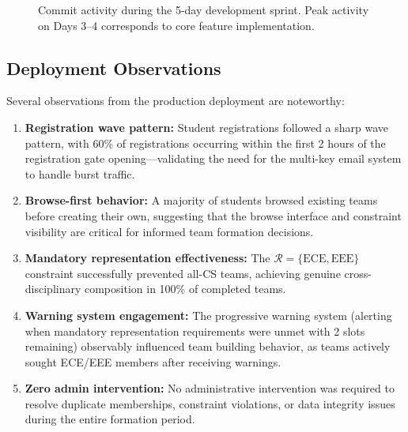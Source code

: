 \documentclass[conference]{IEEEtran}
\begin{document}
\begin{figure}[htbp]
\centering
{}
\caption{Commit activity during the 5-day development sprint. Peak activity on Days 3--4 corresponds to core feature implementation.}
\label{fig:timeline}
\end{figure}

\subsection{Deployment Observations}

Several observations from the production deployment are noteworthy:

\begin{enumerate}[noitemsep,topsep=3pt]
    \item \textbf{Registration wave pattern:} Student registrations followed a sharp wave pattern, with 60\% of registrations occurring within the first 2 hours of the registration gate opening---validating the need for the multi-key email system to handle burst traffic.

    \item \textbf{Browse-first behavior:} A majority of students browsed existing teams before creating their own, suggesting that the browse interface and constraint visibility are critical for informed team formation decisions.

    \item \textbf{Mandatory representation effectiveness:} The $\mathcal{R} = \{\text{ECE}, \text{EEE}\}$ constraint successfully prevented all-CS teams, achieving genuine cross-disciplinary composition in 100\% of completed teams.

    \item \textbf{Warning system engagement:} The progressive warning system (alerting when mandatory representation requirements were unmet with 2 slots remaining) observably influenced team building behavior, as teams actively sought ECE/EEE members after receiving warnings.

    \item \textbf{Zero admin intervention:} No administrative intervention was required to resolve duplicate memberships, constraint violations, or data integrity issues during the entire formation period.
\end{enumerate}
\end{document}
